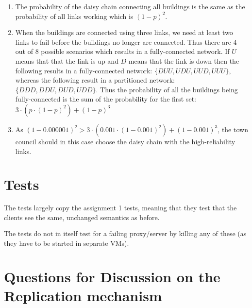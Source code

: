 \documentclass[a4paper, 11pt]{article}
\begin{document}
\begin{enumerate}
    \item The probability of the daisy chain connecting all buildings is the same as the probability of all links working which is $(1-p)^2$.
    \item When the buildings are connected using three links, we need at least two links to fail before the buildings no longer are connected. Thus there are 4 out of 8 possible scenarios which results in a fully-connected network. If $U$ means that that the link is up and $D$ means that the link is down then the following results in a fully-connected network: $\{DUU, UDU, UUD, UUU\}$, whereas the following result in a partitioned network: $\{DDD, DDU, DUD, UDD\}$. Thus the probability of all the buildings being fully-connected is the sum of the probability for the first set: $3 \cdot (p \cdot (1-p)^2) + (1-p)^3$
    \item As $(1-0.000001)^2 > 3 \cdot (0.001 \cdot (1-0.001)^2) + (1-0.001)^3$, the town council should in this case choose the daisy chain with the high-reliability links.
\end{enumerate}

\section{Tests} %
\label{sec:tests}

The tests largely copy the assignment 1 tests, meaning that they test that the clients see the same, unchanged semantics as before.

The tests do not in itself test for a failing proxy/server by killing any of these (as they have to be started in separate VMs).


\section{Questions for Discussion on the Replication mechanism} %
\label{sec:questions_for_discussion_on_the_replication_mechanism}
\end{document}
